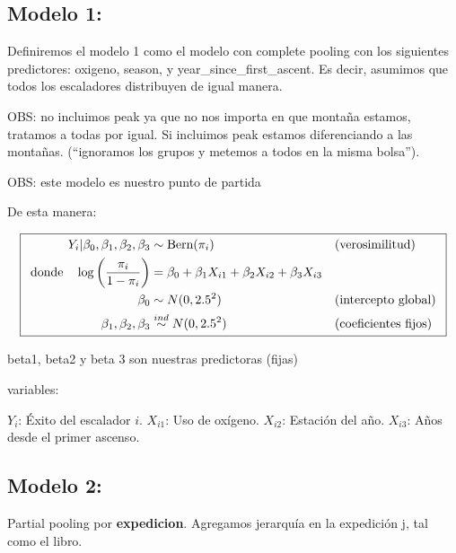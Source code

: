 \documentclass[
  letterpaper,
  DIV=11,
  numbers=noendperiod]{scrartcl}
\begin{document}
\subsection{Modelo 1:}\label{modelo-1}

Definiremos el modelo 1 como el modelo con complete pooling con los
siguientes predictores: oxigeno, season, y year\_since\_first\_ascent.
Es decir, asumimos que todos los escaladores distribuyen de igual
manera.

OBS: no incluimos peak ya que no nos importa en que montaña estamos,
tratamos a todas por igual. Si incluimos peak estamos diferenciando a
las montañas. (``ignoramos los grupos y metemos a todos en la misma
bolsa'').

OBS: este modelo es nuestro punto de partida

De esta manera:

\[\boxed{
\hspace{0.5em}
\begin{aligned}
Y_{i} | \beta_{0}, \beta_1, \beta_2, \beta_3 & \sim \text{Bern}(\pi_{i}) && \text{(verosimilitud)} \\
\text{donde} \quad \log\left(\frac{\pi_{i}}{1-\pi_{i}}\right) & = \beta_{0} + \beta_1 X_{i1} + \beta_2 X_{i2} + \beta_3 X_{i3} \\
\beta_{0} & \sim N(0, 2.5^2) && \text{(intercepto global)} \\
\beta_1, \beta_2, \beta_3 & \overset{ind}{\sim} N(0, 2.5^2) && \text{(coeficientes fijos)}
\end{aligned}
\hspace{0.5em}
}\]

beta1, beta2 y beta 3 son nuestras predictoras (fijas)

variables:

\(Y_i\): Éxito del escalador \(i\). \(X_{i1}\): Uso de oxígeno.
\(X_{i2}\): Estación del año. \(X_{i3}\): Años desde el primer ascenso.

\subsection{Modelo 2:}\label{modelo-2}

Partial pooling por \textbf{expedicion}. Agregamos jerarquía en la
expedición j, tal como el libro.
\end{document}
